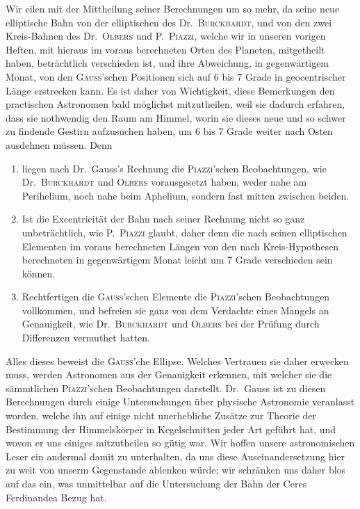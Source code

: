 \documentclass[11pt,a4paper]{book}
\begin{document}
Wir eilen mit der Mittheilung seiner Berechnungen um so mehr, da seine neue elliptische Bahn von der elliptischen des Dr.~\textsc{Burckhardt}, und von den zwei Kreis-Bahnen des Dr.~\textsc{Olbers} und P.~\textsc{Piazzi}, welche wir in unseren vorigen Heften, mit hieraus im voraus berechneten Orten des Planeten, mitgetheilt haben, beträchtlich verschieden ist, und ihre Abweichung, in gegenwärtigem Monat, von den \textsc{Gauss}'schen Positionen sich auf 6 bis 7 Grade in geocentrischer Länge erstrecken kann. Es ist daher von Wichtigkeit, diese Bemerkungen den practischen Astronomen bald möglichst mitzutheilen, weil sie dadurch erfahren, dass sie nothwendig den Raum am Himmel, worin sie dieses neue und so schwer zu findende Gestirn aufzusuchen haben, um 6 bis 7 Grade weiter nach Osten ausdehnen müssen. Denn
\begin{enumerate}[label=\arabic*.]
\item liegen nach Dr.~Gauss's Rechnung die \textsc{Piazzi}'schen Beobachtungen, wie Dr.~\textsc{Burckhardt} und \textsc{Olbers} vorausgesetzt haben, weder nahe am Perihelium, noch nahe beim Aphelium, sondern fast mitten zwischen beiden.
\item Ist die Excentricität der Bahn nach seiner Rechnung nicht so ganz unbeträchtlich, wie P.~\textsc{Piazzi} glaubt, daher denn die nach seinen elliptischen Elementen im voraus berechneten Längen von den nach Kreis-Hypothesen berechneten in gegenwärtigem Monat leicht um 7 Grade verschieden sein können.
\item Rechtfertigen die \textsc{Gauss}'schen Elemente die \textsc{Piazzi}'schen Beobachtungen vollkommen, und befreien sie ganz von dem Verdachte eines Mangels an Genauigkeit, wie Dr.~\textsc{Burckhardt} und \textsc{Olbers} bei der Prüfung durch Differenzen vermuthet hatten.
\end{enumerate}

Alles dieses beweist die \textsc{Gauss}'che Ellipse. Welches Vertrauen sie daher erwecken muss, werden Astronomen aus der Genauigkeit erkennen, mit welcher sie die sämmtlichen \textsc{Piazzi}'schen Beobachtungen darstellt. Dr.~Gauss ist zu diesen Berechnungen durch einige Untersuchungen über physische Astronomie veranlasst worden, welche ihn auf einige nicht unerhebliche Zusätze zur Theorie der Bestimmung der Himmelskörper in Kegelschnitten jeder Art geführt hat, und wovon er uns einiges mitzutheilen so gütig war. Wir hoffen unsere astronomischen Leser ein andermal damit zu unterhalten, da uns diese Auseinandersetzung hier zu weit von unserm Gegenstande ablenken würde; wir schränken uns daher blos auf das ein, was unmittelbar auf die Untersuchung der Bahn der Ceres Ferdinandea Bezug hat.
\end{document}
